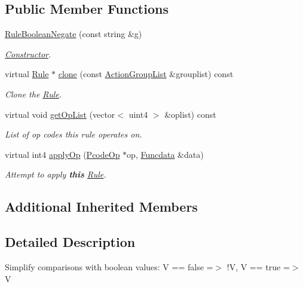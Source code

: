 \subsection*{Public Member Functions}
\begin{DoxyCompactItemize}
\item 
\mbox{\hyperlink{class_rule_boolean_negate_a40fd475a9f7d9cd831aee240d196810f}{Rule\+Boolean\+Negate}} (const string \&g)
\begin{DoxyCompactList}\small\item\em \mbox{\hyperlink{class_constructor}{Constructor}}. \end{DoxyCompactList}\item 
virtual \mbox{\hyperlink{class_rule}{Rule}} $\ast$ \mbox{\hyperlink{class_rule_boolean_negate_ad833fb025b67547a2da6df4ab5674ce1}{clone}} (const \mbox{\hyperlink{class_action_group_list}{Action\+Group\+List}} \&grouplist) const
\begin{DoxyCompactList}\small\item\em Clone the \mbox{\hyperlink{class_rule}{Rule}}. \end{DoxyCompactList}\item 
virtual void \mbox{\hyperlink{class_rule_boolean_negate_af6db5a859074d99716ce46daae31329c}{get\+Op\+List}} (vector$<$ uint4 $>$ \&oplist) const
\begin{DoxyCompactList}\small\item\em List of op codes this rule operates on. \end{DoxyCompactList}\item 
virtual int4 \mbox{\hyperlink{class_rule_boolean_negate_a8c8aa1437392ae57f49b56f314233bab}{apply\+Op}} (\mbox{\hyperlink{class_pcode_op}{Pcode\+Op}} $\ast$op, \mbox{\hyperlink{class_funcdata}{Funcdata}} \&data)
\begin{DoxyCompactList}\small\item\em Attempt to apply {\bfseries{this}} \mbox{\hyperlink{class_rule}{Rule}}. \end{DoxyCompactList}\end{DoxyCompactItemize}
\subsection*{Additional Inherited Members}


\subsection{Detailed Description}
Simplify comparisons with boolean values\+: {\ttfamily V == false =$>$ !V, V == true =$>$ V} 


